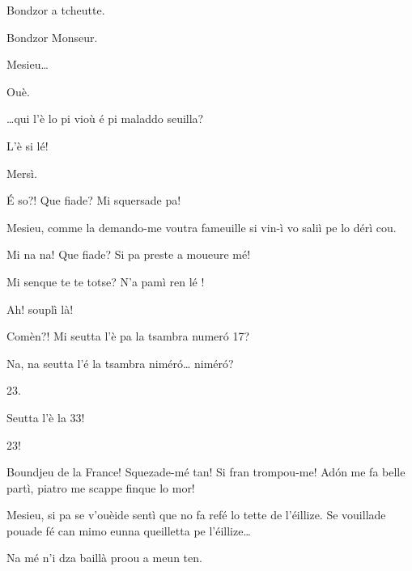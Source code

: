 \begin{drama}
\Priespeaks{} Bondzor a tcheutte.

\Casimirspeaks Bondzor Monseur.


\Priespeaks Mesieu\ldots

\Eunfeurmispeaks Ouè.

\Priespeaks \ldots qui l'è lo pi vioù é pi maladdo seuilla?

\Eunfeurmispeaks {}
L'è si lé!

\Priespeaks Mersì.


\Casimirspeaks{} \'E so?! Que fiade? Mi squersade pa!

\Priespeaks {} Mesieu, comme la demando-me voutra fameuille si vin-ì vo saliì pe lo dérì cou.

\Casimirspeaks {} Mi na na! Que fiade? Si pa preste a moueure mé!

\Gerominespeaks Mi senque te te totse? N'a pamì ren lé \riye !

\Casimirspeaks Ah! souplì là!

\Priespeaks {} Comèn?! Mi seutta l’è pa la tsambra numer\'o 17?

\Casimirspeaks Na, na seutta l’é la tsambra nimér\'o\ldots {} nimér\'o?

\Gerominespeaks {} 23.

\Casimirspeaks Seutta l’è la 33!

\Gerominespeaks {} 23!

\Priespeaks Boundjeu de la France! Squezade-mé tan! Si fran trom\-pou-me! Ad\'on me fa belle partì, piatro me scappe finque lo mor!


\Priespeaks Mesieu, si pa se v'ouèide sentì que no fa refé lo tette de l’éillize. Se vouillade pouade fé can mimo eunna queilletta pe l’éillize\ldots

\Casimirspeaks Na mé n'i dza baillà proou a meun ten.


\end{drama}
